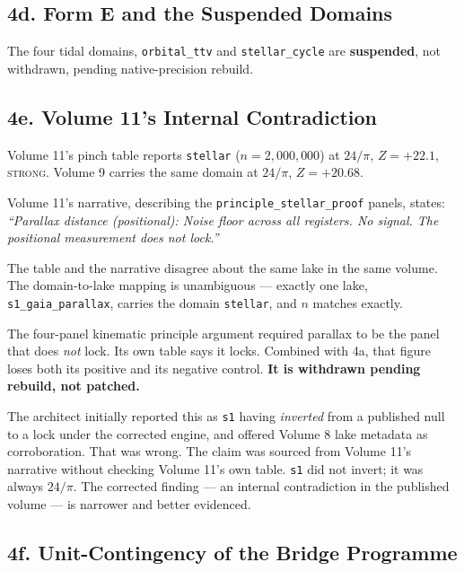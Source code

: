 \documentclass[11pt, letterpaper, openany]{book}
\begin{document}
\subsection{4d. Form E and the Suspended Domains}

The four tidal domains, \texttt{orbital\_ttv} and \texttt{stellar\_cycle} are \textbf{suspended},
not withdrawn, pending native-precision rebuild.

\subsection{4e. Volume 11's Internal Contradiction}

\begin{erratumbox}
Volume 11's pinch table reports \texttt{stellar} ($n = 2{,}000{,}000$) at $24/\pi$, $Z = +22.1$,
\textsc{strong}. Volume 9 carries the same domain at $24/\pi$, $Z = +20.68$.

\medskip
Volume 11's narrative, describing the \texttt{principle\_stellar\_proof} panels, states:
\emph{``Parallax distance (positional): Noise floor across all registers. No signal. The
positional measurement does not lock.''}

\medskip
The table and the narrative disagree about the same lake in the same volume. The
domain-to-lake mapping is unambiguous --- exactly one lake, \texttt{s1\_gaia\_parallax}, carries
the domain \texttt{stellar}, and $n$ matches exactly.

\medskip
The four-panel kinematic principle argument required parallax to be the panel that does
\emph{not} lock. Its own table says it locks. Combined with 4a, that figure loses both its
positive and its negative control. \textbf{It is withdrawn pending rebuild, not patched.}
\end{erratumbox}

\begin{correctionbox}
The architect initially reported this as \texttt{s1} having \emph{inverted} from a published
null to a lock under the corrected engine, and offered Volume 8 lake metadata as corroboration.
That was wrong. The claim was sourced from Volume 11's narrative without checking Volume 11's
own table. \texttt{s1} did not invert; it was always $24/\pi$. The corrected finding --- an
internal contradiction in the published volume --- is narrower and better evidenced.
\end{correctionbox}

\subsection{4f. Unit-Contingency of the Bridge Programme}
\end{document}
